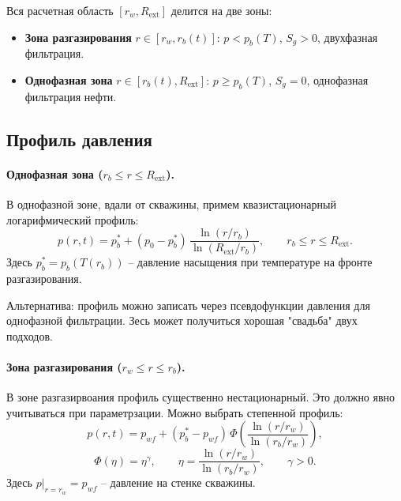 \documentclass[12pt,a4paper]{article}
\newcommand{\ext}{\mathrm{ext}}
\begin{document}
Вся расчетная область $[r_w, R_\ext]$ делится на две зоны:
\begin{itemize}[nosep]
  \item \textbf{Зона разгазирования} $r \in [r_w, r_b(t)]$:
        $p < p_b(T)$, $S_g > 0$, двухфазная фильтрация.
  \item \textbf{Однофазная зона} $r \in [r_b(t), R_\ext]$:
        $p \geqslant p_b(T)$, $S_g = 0$, однофазная фильтрация нефти.
\end{itemize}

\subsection{Профиль давления}

\paragraph{Однофазная зона ($r_b \leqslant r \leqslant R_\ext$).} 
В однофазной зоне, вдали от скважины, примем
квазистационарный логарифмический профиль:
\begin{equation}\label{eq:p_outer}
  p(r,t) = p_b^* + (p_0 - p_b^*)\,
    \frac{\ln(r/r_b)}{\ln(R_\ext/r_b)},
  \qquad r_b \leqslant r \leqslant R_\ext.
\end{equation}
Здесь $p_b^* = p_b(T(r_b))$ -- давление насыщения
при температуре на фронте разгазирования.

Альтернатива: профиль можно записать через псевдофункции давления для однофазной фильтрации.
Зесь может получиться хорошая "свадьба" двух подходов.

\paragraph{Зона разгазирования ($r_w \leqslant r \leqslant r_b$).}
В зоне разгазирвоания профиль существенно нестационарный. 
Это должно явно учитываться при параметрзации.
Можно выбрать степенной профиль:
\begin{equation}\label{eq:p_inner}
  p(r,t) = p_{wf} + (p_b^* - p_{wf})\,\Phi\!\left(
    \frac{\ln(r/r_w)}{\ln(r_b/r_w)}
  \right),
\end{equation}
\begin{equation}\label{eq:Phi}
  \Phi(\eta) = \eta^\gamma, \qquad
  \eta = \frac{\ln(r/r_w)}{\ln(r_b/r_w)},
  \qquad \gamma > 0.
\end{equation}
Здесь $p|_{r=r_w}=p_{wf}$ -- давление на стенке скважины.
\end{document}
